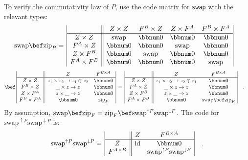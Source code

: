 To verify the commutativity law of $P$, use the code matrix for \lstinline!swap!
with the relevant types:
\begin{align*}
 & \text{swap}\bef\text{zip}_{P}=\,\begin{array}{|c||cccc|}
 & Z\times Z & F^{B}\times Z & Z\times F^{A} & F^{B}\times F^{A}\\
\hline Z\times Z & \text{swap} & \bbnum 0 & \bbnum 0 & \bbnum 0\\
F^{A}\times Z & \bbnum 0 & \bbnum 0 & \text{swap} & \bbnum 0\\
Z\times F^{B} & \bbnum 0 & \text{swap} & \bbnum 0 & \bbnum 0\\
F^{A}\times F^{B} & \bbnum 0 & \bbnum 0 & \bbnum 0 & \text{swap}
\end{array}
\end{align*}
\begin{align*}
 & \bef\,\begin{array}{|c||cc|}
 & Z & F^{B\times A}\\
\hline Z\times Z & z_{1}\times z_{2}\rightarrow z_{1}\oplus z_{2} & \bbnum 0\\
F^{B}\times Z & \_\times z\rightarrow z & \bbnum 0\\
Z\times F^{A} & z\times\_\rightarrow z & \bbnum 0\\
F^{B}\times F^{A} & \bbnum 0 & \text{zip}_{F}
\end{array}\,=\,\begin{array}{|c||cc|}
 & Z & F^{B\times A}\\
\hline Z\times Z & z_{1}\times z_{2}\rightarrow z_{2}\oplus z_{1} & \bbnum 0\\
F^{A}\times Z & \_\times z\rightarrow z & \bbnum 0\\
Z\times F^{B} & z\times\_\rightarrow z & \bbnum 0\\
F^{A}\times F^{B} & \bbnum 0 & \text{swap}\bef\text{zip}_{F}
\end{array}\quad.
\end{align*}
By assumption, $\text{swap}\bef\text{zip}_{F}=\text{zip}_{F}\bef\text{swap}^{\uparrow F}\text{swap}^{\downarrow F}$.
The code for $\text{swap}^{\uparrow P}\text{swap}^{\downarrow P}$
is:
\[
\text{swap}^{\uparrow P}\text{swap}^{\downarrow P}=\,\begin{array}{|c||cc|}
 & Z & F^{B\times A}\\
\hline Z & \text{id} & \bbnum 0\\
F^{A\times B} &  & \text{swap}^{\uparrow F}\text{swap}^{\downarrow F}
\end{array}\quad.
\]
